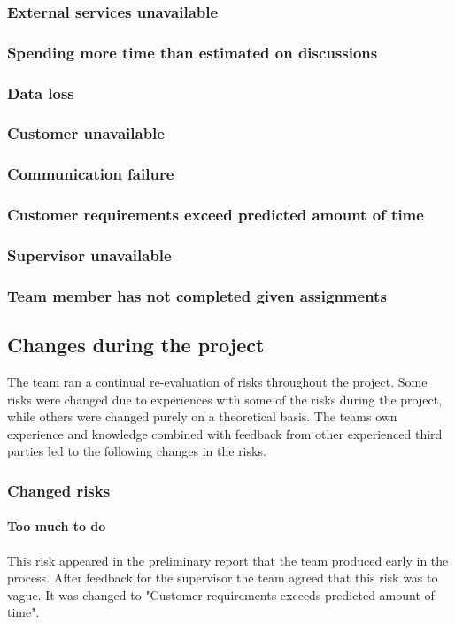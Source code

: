 \subsubsection{External services unavailable}
\subsubsection{Spending more time than estimated on discussions}
\subsubsection{Data loss}
\subsubsection{Customer unavailable}
\subsubsection{Communication failure}
\subsubsection{Customer requirements exceed predicted amount of time}
\subsubsection{Supervisor unavailable}
\subsubsection{Team member has not completed given assignments}


\subsection{Changes during the project}
The team ran a continual re-evaluation of risks throughout the project. Some risks were changed due to experiences with some of the risks during the project, while others were changed purely on a theoretical basis. The teams own experience and knowledge combined with feedback from other experienced third parties led to the following changes in the risks.

\subsubsection{Changed risks}
\paragraph{Too much to do}
This risk appeared in the preliminary report that the team produced early in the process. After feedback for the supervisor the team agreed that this risk was to vague. It was changed to "Customer requirements exceeds predicted amount of time".

